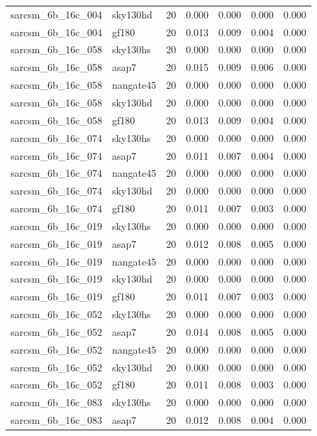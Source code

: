 \begin{tabular}{llrrrrr}
sarcsm\_6b\_16c\_004 & sky130hd & 20 & 0.000 & 0.000 & 0.000 & 0.000 \\
sarcsm\_6b\_16c\_004 & gf180 & 20 & 0.013 & 0.009 & 0.004 & 0.000 \\
sarcsm\_6b\_16c\_058 & sky130hs & 20 & 0.000 & 0.000 & 0.000 & 0.000 \\
sarcsm\_6b\_16c\_058 & asap7 & 20 & 0.015 & 0.009 & 0.006 & 0.000 \\
sarcsm\_6b\_16c\_058 & nangate45 & 20 & 0.000 & 0.000 & 0.000 & 0.000 \\
sarcsm\_6b\_16c\_058 & sky130hd & 20 & 0.000 & 0.000 & 0.000 & 0.000 \\
sarcsm\_6b\_16c\_058 & gf180 & 20 & 0.013 & 0.009 & 0.004 & 0.000 \\
sarcsm\_6b\_16c\_074 & sky130hs & 20 & 0.000 & 0.000 & 0.000 & 0.000 \\
sarcsm\_6b\_16c\_074 & asap7 & 20 & 0.011 & 0.007 & 0.004 & 0.000 \\
sarcsm\_6b\_16c\_074 & nangate45 & 20 & 0.000 & 0.000 & 0.000 & 0.000 \\
sarcsm\_6b\_16c\_074 & sky130hd & 20 & 0.000 & 0.000 & 0.000 & 0.000 \\
sarcsm\_6b\_16c\_074 & gf180 & 20 & 0.011 & 0.007 & 0.003 & 0.000 \\
sarcsm\_6b\_16c\_019 & sky130hs & 20 & 0.000 & 0.000 & 0.000 & 0.000 \\
sarcsm\_6b\_16c\_019 & asap7 & 20 & 0.012 & 0.008 & 0.005 & 0.000 \\
sarcsm\_6b\_16c\_019 & nangate45 & 20 & 0.000 & 0.000 & 0.000 & 0.000 \\
sarcsm\_6b\_16c\_019 & sky130hd & 20 & 0.000 & 0.000 & 0.000 & 0.000 \\
sarcsm\_6b\_16c\_019 & gf180 & 20 & 0.011 & 0.007 & 0.003 & 0.000 \\
sarcsm\_6b\_16c\_052 & sky130hs & 20 & 0.000 & 0.000 & 0.000 & 0.000 \\
sarcsm\_6b\_16c\_052 & asap7 & 20 & 0.014 & 0.008 & 0.005 & 0.000 \\
sarcsm\_6b\_16c\_052 & nangate45 & 20 & 0.000 & 0.000 & 0.000 & 0.000 \\
sarcsm\_6b\_16c\_052 & sky130hd & 20 & 0.000 & 0.000 & 0.000 & 0.000 \\
sarcsm\_6b\_16c\_052 & gf180 & 20 & 0.011 & 0.008 & 0.003 & 0.000 \\
sarcsm\_6b\_16c\_083 & sky130hs & 20 & 0.000 & 0.000 & 0.000 & 0.000 \\
sarcsm\_6b\_16c\_083 & asap7 & 20 & 0.012 & 0.008 & 0.004 & 0.000 \\

\end{tabular}
